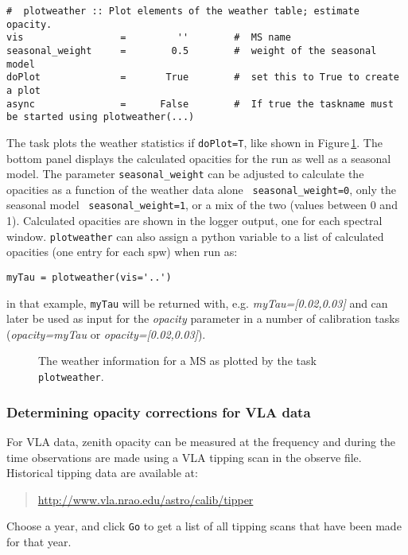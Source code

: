 \small
\begin{verbatim}
#  plotweather :: Plot elements of the weather table; estimate opacity.
vis                 =         ''        #  MS name
seasonal_weight     =        0.5        #  weight of the seasonal model
doPlot              =       True        #  set this to True to create a plot
async               =      False        #  If true the taskname must be started using plotweather(...)
\end{verbatim}
\normalsize

The task plots the weather statistics if {\tt doPlot=T}, like shown in
Figure\,\ref{fig:plotweather}. The bottom panel displays the
calculated opacities for the run as well as a seasonal model. The
parameter {\tt seasonal\_weight} can be adjusted to calculate the
opacities as a function of the weather data alone {\tt
  seasonal\_weight=0}, only the seasonal model {\tt
  seasonal\_weight=1}, or a mix of the two (values between 0 and
1). Calculated opacities are shown in the logger output, one for each
spectral window. {\tt plotweather} can also assign a python variable
to a list of calculated opacities (one entry for each spw) when run as:

\small
\begin{verbatim}
myTau = plotweather(vis='..')
\end{verbatim}
\normalsize

in that example, {\tt myTau} will be returned with, e.g. {\it
  myTau=[0.02,0.03]} and can later be used as input for the {\it
  opacity} parameter in a number of calibration tasks ({\it opacity=myTau} or {\it
  opacity=[0.02,0.03]}).


\begin{figure}[h!]
\begin{center}
\caption{\label{fig:plotweather}
The weather information for a MS as plotted by the task {\tt plotweather}.}
\hrulefill
\end{center}
\end{figure}




\subsubsection{Determining opacity corrections for VLA data}
\label{section:cal.prior.opacity.vla}

For VLA data, zenith opacity can be measured at the frequency
and during the time observations are made using a VLA tipping scan in
the observe file.  Historical tipping data are available at:
\begin{quote}
   \url{http://www.vla.nrao.edu/astro/calib/tipper}
\end{quote}
Choose a year, and click {\tt Go} to get a list of all tipping scans
that have been made for that year.

